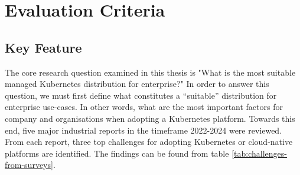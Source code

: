 \chapter{Evaluation Criteria}\label{chap:evaluation-criteria}

\section{Key Feature}\label{key-features-for-evaluation}


The core research question examined in this thesis is "What is the most suitable managed Kubernetes distribution for enterprise?" In order to answer this question, we must first define what constitutes a “suitable” distribution for enterprise use-cases. In other words, what are the most important factors for company and organisations when adopting a Kubernetes platform. Towards this end, five major industrial reports in the timeframe 2022-2024 were reviewed. From each report, three top challenges for adopting Kubernetes or cloud-native platforms are identified. The findings can be found from table \ref{tab:challenges-from-surveys}.


